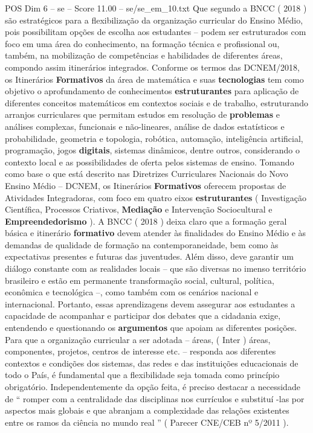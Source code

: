 \begin{textsample}{POS Dim 6 – se – Score 11.00 – se/se\_em\_10.txt}
Que segundo a BNCC ( 2018 ) são estratégicos para a flexibilização da organização curricular do Ensino Médio, pois possibilitam opções de escolha aos estudantes – podem ser estruturados com foco em uma área do conhecimento, na formação técnica e profissional ou, também, na mobilização de competências e habilidades de diferentes áreas, compondo assim itinerários integrados.
Conforme os termos das DCNEM/2018, os Itinerários \textbf{Formativos} da área de matemática e suas \textbf{tecnologias} tem como objetivo o aprofundamento de conhecimentos \textbf{estruturantes} para aplicação de diferentes conceitos matemáticos em contextos sociais e de trabalho, estruturando arranjos curriculares que permitam estudos em resolução de \textbf{problemas} e análises complexas, funcionais e não-lineares, análise de dados estatísticos e probabilidade, geometria e topologia, robótica, automação, inteligência artificial, programação, jogos \textbf{digitais}, sistemas dinâmicos, dentre outros, considerando o contexto local e as possibilidades de oferta pelos sistemas de ensino.
Tomando como base o que está descrito nas Diretrizes Curriculares Nacionais do Novo Ensino Médio – DCNEM, os Itinerários \textbf{Formativos} oferecem propostas de Atividades Integradoras, com foco em quatro eixos \textbf{estruturantes} ( Investigação Científica, Processos Criativos, \textbf{Mediação} e Intervenção Sociocultural e \textbf{Empreendedorismo} ).
A BNCC ( 2018 ) deixa claro que a formação geral básica e itinerário \textbf{formativo} devem atender às finalidades do Ensino Médio e às demandas de qualidade de formação na contemporaneidade, bem como às expectativas presentes e futuras das juventudes.
Além disso, deve garantir um diálogo constante com as realidades locais – que são diversas no imenso território brasileiro e estão em permanente transformação social, cultural, política, econômica e tecnológica –, como também com os cenários nacional e internacional.
Portanto, essas aprendizagens devem assegurar aos estudantes a capacidade de acompanhar e participar dos debates que a cidadania exige, entendendo e questionando os \textbf{argumentos} que apoiam as diferentes posições.
Para que a organização curricular a ser adotada – áreas, ( Inter ) áreas, componentes, projetos, centros de interesse etc. – responda aos diferentes contextos e condições dos sistemas, das redes e das instituições educacionais de todo o País, é fundamental que a flexibilidade seja tomada como princípio obrigatório.
Independentemente da opção feita, é preciso destacar a necessidade de “ romper com a centralidade das disciplinas nos currículos e substituí -las por aspectos mais globais e que abranjam a complexidade das relações existentes entre os ramos da ciência no mundo real ” ( Parecer CNE/CEB nº 5/2011 ).

\end{textsample}
